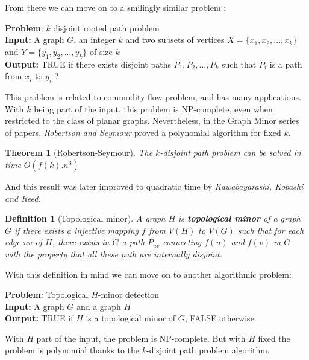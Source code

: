 \documentclass[12pt,a4paper]{article}
\newtheorem{theorem}{Theorem}
\newtheorem{definition}{Definition}
\begin{document}
\noindent From there we can move on to a smilingly similar problem :

\vspace{0.2cm}
\noindent \textbf{Problem}: $k$ disjoint rooted path problem\\
\textbf{Input:} A graph $G$, an integer $k$ and two subsets of vertices $X=\{x_1, x_2, ..., x_k\}$ and $Y=\{y_1, y_2, ..., y_k\}$ of size $k$\\
\textbf{Output:} TRUE if there exists disjoint paths $P_1, P_2, ..., P_k$ such that $P_i$ is a path from $x_i$ to $y_i$ ?
\vspace{0.2cm}

\noindent This problem is related to commodity flow problem, and has many applications. With $k$ being part of the input, this problem is NP-complete, even when restricted to the class of planar graphs. Nevertheless, in the Graph Minor series of papers, \textit{Robertson and Seymour} proved a polynomial algorithm for fixed $k$.

\begin{theorem}[Robertson-Seymour]
The $k$-disjoint path problem can be solved in time $O(f(k).n^3)$
\end{theorem}

And this result was later improved to quadratic time by \textit{ Kawabayarashi, Kobashi and Reed}.

\begin{definition}[Topological minor]
 A graph $H$ is \textbf{topological minor} of a graph $G$ if there exists a injective mapping $f$ from $V(H)$ to $V(G)$ such that for each edge $uv$ of $H$, there exists in $G$ a path $P_{uv}$ connecting $f(u)$ and $f(v)$ in $G$ with the property that all these path are internally disjoint.
\end{definition}


\noindent With this definition in mind we can move on to another algorithmic problem:

\vspace{0.2cm}
\noindent \textbf{Problem}: Topological $H$-minor detection\\
\textbf{Input:} A graph $G$ and a graph $H$\\
\textbf{Output:} TRUE if $H$ is a topological minor of $G$, FALSE otherwise.
\vspace{0.2cm}

\noindent 
With $H$ part of the input, the problem is NP-complete. But with $H$ fixed the problem is polynomial thanks to the $k$-disjoint path problem algorithm.
\end{document}
